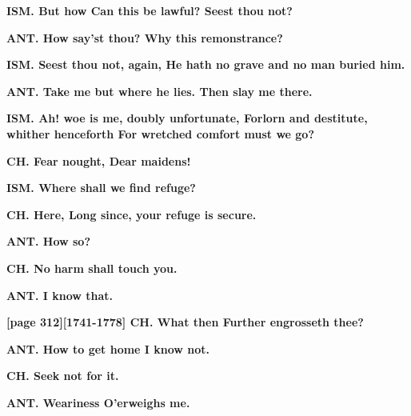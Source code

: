 \documentclass[11pt,letter]{book}
\begin{document}
\par \textbf{ISM. But how Can this be lawful? Seest thou not?}
\par 

\par \textbf{ANT. How say’st thou? Why this remonstrance?}
\par 

\par \textbf{ISM. Seest thou not, again, He hath no grave and no man buried him.}
\par 

\par \textbf{ANT. Take me but where he lies. Then slay me there.}
\par 

\par \textbf{ISM. Ah! woe is me, doubly unfortunate, Forlorn and destitute, whither henceforth For wretched comfort must we go?}
\par 

\par \textbf{CH. Fear nought, Dear maidens!}
\par 

\par \textbf{ISM. Where shall we find refuge?}
\par 

\par \textbf{CH. Here, Long since, your refuge is secure.}
\par 

\par \textbf{ANT. How so?}
\par 

\par \textbf{CH. No harm shall touch you.}
\par 

\par \textbf{ANT. I know that.}
\par 

\par \textbf{[page 312][1741-1778] CH. What then Further engrosseth thee?}
\par 

\par \textbf{ANT. How to get home I know not.}
\par 

\par \textbf{CH. Seek not for it.}
\par 

\par \textbf{ANT. Weariness O’erweighs me.}
\par 
\end{document}
